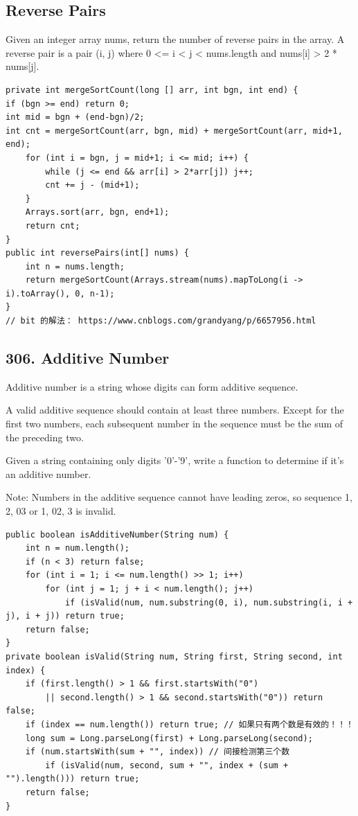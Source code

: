 \documentclass[9pt, b5paper]{article}
\begin{document}
\subsection{Reverse Pairs}
\label{sec-7-3}
Given an integer array nums, return the number of reverse pairs in the array.
A reverse pair is a pair (i, j) where 0 <= i < j < nums.length and nums[i] > 2 * nums[j].
\begin{verbatim}
private int mergeSortCount(long [] arr, int bgn, int end) {
if (bgn >= end) return 0;
int mid = bgn + (end-bgn)/2;
int cnt = mergeSortCount(arr, bgn, mid) + mergeSortCount(arr, mid+1, end);
    for (int i = bgn, j = mid+1; i <= mid; i++) {
        while (j <= end && arr[i] > 2*arr[j]) j++;
        cnt += j - (mid+1);
    }
    Arrays.sort(arr, bgn, end+1);
    return cnt;
}
public int reversePairs(int[] nums) {
    int n = nums.length;
    return mergeSortCount(Arrays.stream(nums).mapToLong(i -> i).toArray(), 0, n-1);
}
// bit 的解法： https://www.cnblogs.com/grandyang/p/6657956.html
\end{verbatim}

\subsection{306. Additive Number}
\label{sec-7-4}
Additive number is a string whose digits can form additive sequence.

A valid additive sequence should contain at least three numbers. Except for the first two numbers, each subsequent number in the sequence must be the sum of the preceding two.

Given a string containing only digits '0'-'9', write a function to determine if it's an additive number.

Note: Numbers in the additive sequence cannot have leading zeros, so sequence 1, 2, 03 or 1, 02, 3 is invalid.
\begin{verbatim}
public boolean isAdditiveNumber(String num) {
    int n = num.length();
    if (n < 3) return false;
    for (int i = 1; i <= num.length() >> 1; i++)
        for (int j = 1; j + i < num.length(); j++)  
            if (isValid(num, num.substring(0, i), num.substring(i, i + j), i + j)) return true;
    return false;
}
private boolean isValid(String num, String first, String second, int index) {
    if (first.length() > 1 && first.startsWith("0") 
        || second.length() > 1 && second.startsWith("0")) return false;
    if (index == num.length()) return true; // 如果只有两个数是有效的！！！
    long sum = Long.parseLong(first) + Long.parseLong(second);
    if (num.startsWith(sum + "", index)) // 间接检测第三个数
        if (isValid(num, second, sum + "", index + (sum + "").length())) return true;
    return false;
}
\end{verbatim}
\end{document}

